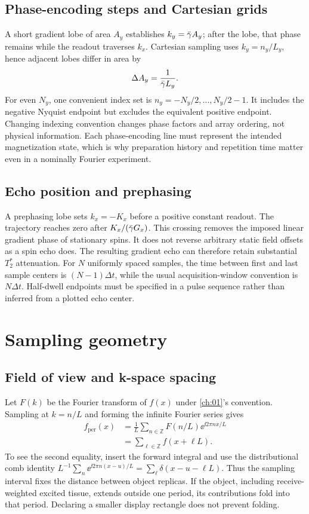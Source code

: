 \subsection{Phase-encoding steps and Cartesian grids}
A short gradient lobe of area \(A_y\) establishes
\(k_y=\bar{\gamma} A_y\); after the lobe, that phase remains while the readout traverses \(k_x\).
Cartesian sampling uses \(k_y=n_y/L_y\), hence adjacent lobes differ in area by
\begin{equation}
 \Delta A_y=\frac{1}{\bar{\gamma} L_y}.
\end{equation}
For even \(N_y\), one convenient index set is
\(n_y=-N_y/2,\ldots,N_y/2-1\). It includes the negative Nyquist endpoint but excludes the equivalent positive endpoint. Changing indexing convention changes phase factors and array ordering, not physical information. Each phase-encoding line must represent the intended magnetization state, which is why preparation history and repetition time matter even in a nominally Fourier experiment.

\subsection{Echo position and prephasing}
A prephasing lobe sets \(k_x=-K_x\) before a positive constant readout. The trajectory reaches zero after \(K_x/(\bar{\gamma} G_x)\). This crossing removes the imposed linear gradient phase of stationary spins. It does not reverse arbitrary static field offsets as a spin echo does. The resulting gradient echo can therefore retain substantial \(T_2^*\) attenuation.
For \(N\) uniformly spaced samples, the time between first and last sample centers is \((N-1)\Delta t\), while the usual acquisition-window convention is \(N\Delta t\). Half-dwell endpoints must be specified in a pulse sequence rather than inferred from a plotted echo center.

\section{Sampling geometry}
\label{sec:05:sampling-geometry}
\subsection{Field of view and k-space spacing}
Let \(F(k)\) be the Fourier transform of \(f(x)\) under \cref{ch:01}'s convention. Sampling at \(k=n/L\) and forming the infinite Fourier series gives
\begin{align}
 f_{\mathrm{per}}(x)
 &=\frac1L\sum_{n\in\mathbb Z}F(n/L)\ee^{\ii2\pi nx/L}\\
 &=\sum_{\ell\in\mathbb Z}f(x+\ell L).
 \label{eq:05:periodization}
\end{align}
To see the second equality, insert the forward integral and use the distributional comb identity
\(L^{-1}\sum_n\ee^{\ii2\pi n(x-u)/L}=\sum_\ell\delta(x-u-\ell L)\).
Thus the sampling interval fixes the distance between object replicas. If the object, including receive-weighted excited tissue, extends outside one period, its contributions fold into that period. Declaring a smaller display rectangle does not prevent folding.

